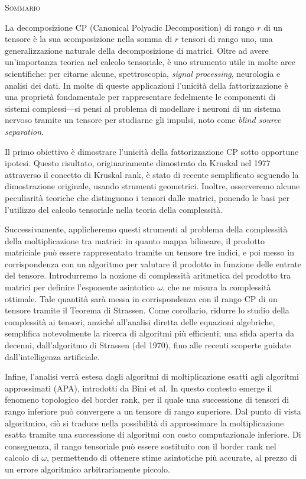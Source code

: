 \begin{center}
  \textsc{Sommario}
\end{center}
%
\noindent
%
La decomposizione CP (Canonical Polyadic Decomposition) di rango $ r $ di un tensore è la sua
scomposizione nella somma di $ r $ tensori di rango uno, una generalizzazione naturale della
decomposizione di matrici. Oltre ad avere un'importanza teorica nel calcolo tensoriale, è uno strumento utile in
molte aree scientifiche: per citarne alcune, spettroscopia, \emph{signal processing}, neurologia e
analisi dei dati. In
molte di queste applicazioni l'unicità della fattorizzazione è una proprietà fondamentale per rappresentare
fedelmente le componenti di sistemi complessi---si pensi al problema di modellare i 
neuroni di un sistema nervoso tramite un tensore per studiarne gli impulsi, noto come \emph{blind
source separation}. 

Il primo obiettivo è dimostrare l'unicità della fattorizzazione CP sotto
opportune ipotesi.
Questo risultato, originariamente dimostrato da Kruskal nel 1977 attraverso il concetto di Kruskal
rank, è stato di recente semplificato seguendo la dimostrazione originale, usando strumenti
geometrici. Inoltre, osserveremo alcune peculiarità teoriche che
distinguono i tensori dalle matrici, ponendo le basi per l'utilizzo del calcolo tensoriale nella
teoria della complessità.

Successivamente, applicheremo questi strumenti al problema della complessità della moltiplicazione
tra matrici: in quanto mappa bilineare, il prodotto matriciale può essere rappresentato tramite un
tensore tre indici, e poi messo in corrispondenza con un algoritmo per valutare il prodotto in
funzione delle entrate del tensore. Introdurremo la nozione di complessità aritmetica del prodotto
tra matrici per definire
l'esponente asintotico $ \omega $, che ne misura la complessità ottimale. Tale quantità sarà messa in corrispondenza con il rango CP
di un tensore tramite il Teorema di Strassen. Come corollario, ridurre lo studio della complessità ai tensori, anziché all'analisi
diretta delle equazioni algebriche, semplifica notevolmente la ricerca di algoritmi più efficienti;
una sfida aperta da decenni, dall'algoritmo di Strassen (del 1970), fino alle recenti scoperte
guidate dall'intelligenza artificiale. 

Infine, l'analisi verrà estesa dagli algoritmi di moltiplicazione esatti agli algoritmi approssimati
(APA), introdotti da Bini et al. In questo contesto emerge il fenomeno topologico del border rank,
per il quale una successione di tensori di rango inferiore può convergere a un tensore di rango
superiore. Dal punto di vista algoritmico, ciò si traduce nella possibilità di approssimare la
moltiplicazione esatta tramite una successione di algoritmi con
costo computazionale inferiore. Di conseguenza,  il
rango tensoriale può essere sostituito con il border rank nel calcolo di $ \omega $, permettendo di ottenere stime asintotiche più
accurate, al prezzo di un errore algoritmico arbitrariamente piccolo.
